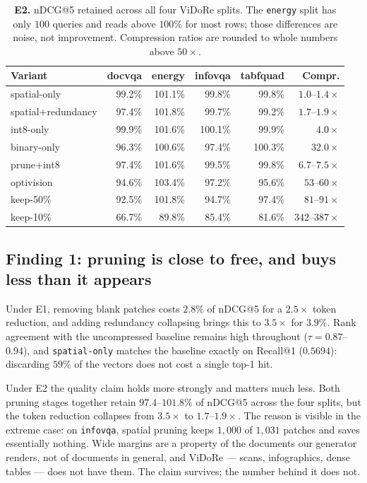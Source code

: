 \documentclass[conference]{IEEEtran}
\begin{document}
\begin{table}[!t]
\caption{\textbf{E2.} nDCG@5 retained across all four ViDoRe splits. The
\texttt{energy} split has only $100$ queries and reads above $100\%$ for most
rows; those differences are noise, not improvement. Compression ratios are
rounded to whole numbers above $50\times$.}
\label{tab:splits}
\centering
\setlength{\tabcolsep}{2.4pt}
\begin{tabular}{@{}lrrrrr@{}}
\toprule
\textbf{Variant} & \textbf{docvqa} & \textbf{energy} & \textbf{infovqa} &
\textbf{tabfquad} & \textbf{Compr.} \\
\midrule
spatial-only & 99.2\% & 101.1\% & 99.8\% & 99.8\% & $1.0$--$1.4\times$ \\
spatial+redundancy & 97.4\% & 101.8\% & 99.7\% & 99.2\% & $1.7$--$1.9\times$ \\
int8-only & 99.9\% & 101.6\% & 100.1\% & 99.9\% & $4.0\times$ \\
binary-only & 96.3\% & 100.6\% & 97.4\% & 100.3\% & $32.0\times$ \\
prune+int8 & 97.4\% & 101.6\% & 99.5\% & 99.8\% & $6.7$--$7.5\times$ \\
optivision & 94.6\% & 103.4\% & 97.2\% & 95.6\% & $53$--$60\times$ \\
keep-50\% & 92.5\% & 101.8\% & 94.7\% & 97.4\% & $81$--$91\times$ \\
keep-10\% & 66.7\% & 89.8\% & 85.4\% & 81.6\% & $342$--$387\times$ \\
\bottomrule
\end{tabular}
\end{table}

\subsection{Finding 1: pruning is close to free, and buys less than it appears}
Under E1, removing blank patches costs $2.8\%$ of nDCG@5 for a $2.5\times$ token
reduction, and adding redundancy collapsing brings this to $3.5\times$ for
$3.9\%$. Rank agreement with the uncompressed baseline remains high throughout
($\tau = 0.87$--$0.94$), and \texttt{spatial-only} matches the baseline exactly on
Recall@1 ($0.5694$): discarding $59\%$ of the vectors does not cost a single top-1
hit.

Under E2 the quality claim holds more strongly and matters much less. Both
pruning stages together retain $97.4$--$101.8\%$ of nDCG@5 across the four splits,
but the token reduction collapses from $3.5\times$ to $1.7$--$1.9\times$. The
reason is visible in the extreme case: on \texttt{infovqa}, spatial pruning keeps
$1{,}000$ of $1{,}031$ patches and saves essentially nothing. Wide margins are a
property of the documents our generator renders, not of documents in general, and
ViDoRe --- scans, infographics, dense tables --- does not have them. The claim
survives; the number behind it does not.
\end{document}
